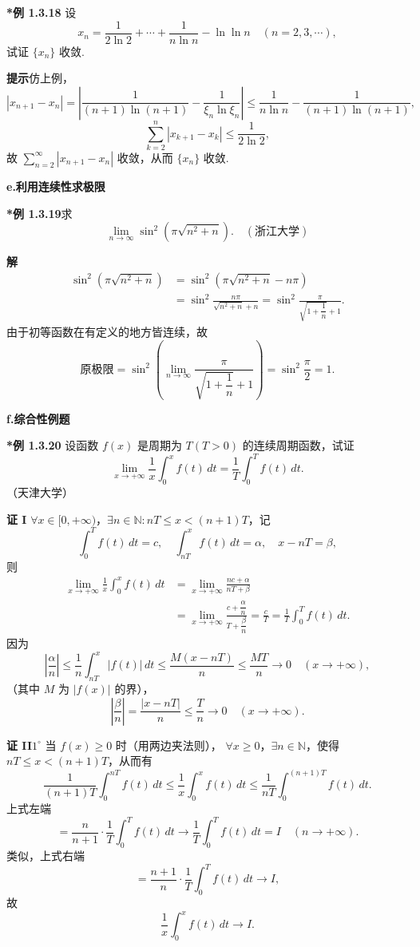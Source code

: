 \documentclass[UTF8, 12pt, fontset=fandol, oneside]{ctexart}
\begin{document}
\noindent\textbf{*例 1.3.18}\quad
设
\[
  x_n=\frac1{2\ln2}+\cdots+\frac1{n\ln n}-\ln\ln n
  \quad(n=2,3,\cdots),
\]
试证 $\{x_n\}$ 收敛.

\noindent\textbf{提示}\quad 仿上例，
\[
  |x_{n+1}-x_n|
  =\left|
  \frac1{(n+1)\ln(n+1)}-\frac1{\xi_n\ln\xi_n}
  \right|
  \le
  \frac1{n\ln n}-\frac1{(n+1)\ln(n+1)},
\]
\[
  \sum_{k=2}^n|x_{k+1}-x_k|
  \le\frac1{2\ln2},
\]
故 $\sum\limits_{n=2}^\infty|x_{n+1}-x_n|$ 收敛，从而
$\{x_n\}$ 收敛.

\noindent\textbf{e.\quad 利用连续性求极限}

\noindent\textbf{*例 1.3.19}\quad 求
\[
  \lim_{n\to\infty}\sin^2\left(\pi\sqrt{n^2+n}\right).
\quad(\text{浙江大学})
\]

\noindent\textbf{解}\quad
\[
\begin{aligned}
\sin^2\left(\pi\sqrt{n^2+n}\right)
&=\sin^2\left(\pi\sqrt{n^2+n}-n\pi\right)\\
&=\sin^2\frac{n\pi}{\sqrt{n^2+n}+n}
=\sin^2\frac{\pi}{\sqrt{1+\dfrac1n}+1}.
\end{aligned}
\]
由于初等函数在有定义的地方皆连续，故
\[
  \text{原极限}
  =\sin^2\left(
  \lim_{n\to\infty}
  \frac{\pi}{\sqrt{1+\dfrac1n}+1}
  \right)
  =\sin^2\frac\pi2=1.
\]

\noindent\textbf{f.\quad 综合性例题}

\noindent\textbf{*例 1.3.20}\quad
设函数 $f(x)$ 是周期为 $T(T>0)$ 的连续周期函数，试证
\[
  \lim_{x\to+\infty}\frac1x\int_0^xf(t)\,dt
  =\frac1T\int_0^Tf(t)\,dt.
\]
（天津大学）

\noindent\textbf{证 I}\quad
$\forall x\in[0,+\infty)$，$\exists n\in\mathbb N:nT\le x<(n+1)T$，记
\[
  \int_0^Tf(t)\,dt=c,\quad
  \int_{nT}^xf(t)\,dt=\alpha,\quad x-nT=\beta,
\]
则
\[
\begin{aligned}
\lim_{x\to+\infty}\frac1x\int_0^xf(t)\,dt
&=\lim_{x\to+\infty}\frac{nc+\alpha}{nT+\beta}\\
&=\lim_{x\to+\infty}
\frac{c+\dfrac{\alpha}{n}}{T+\dfrac{\beta}{n}}
=\frac cT=\frac1T\int_0^Tf(t)\,dt.
\end{aligned}
\]
因为
\[
  \left|\frac\alpha n\right|
  \le\frac1n\int_{nT}^x|f(t)|\,dt
  \le\frac{M(x-nT)}n
  \le\frac{MT}n\to0\quad(x\to+\infty),
\]
（其中 $M$ 为 $|f(x)|$ 的界），
\[
  \left|\frac\beta n\right|
  =\frac{|x-nT|}{n}\le\frac Tn\to0
  \quad(x\to+\infty).
\]

\noindent\textbf{证 II}\quad $1^\circ$ 当 $f(x)\ge0$ 时（用两边夹法则），
$\forall x\ge0$，$\exists n\in\mathbb N$，使得 $nT\le x<(n+1)T$，从而有
\[
  \frac1{(n+1)T}\int_0^{nT}f(t)\,dt
  \le
  \frac1x\int_0^xf(t)\,dt
  \le
  \frac1{nT}\int_0^{(n+1)T}f(t)\,dt.
\]
上式左端
\[
  =\frac n{n+1}\cdot\frac1T\int_0^Tf(t)\,dt
  \to\frac1T\int_0^Tf(t)\,dt=I
  \quad(n\to+\infty).
\]
类似，上式右端
\[
  =\frac{n+1}{n}\cdot\frac1T\int_0^Tf(t)\,dt
  \to I,
\]
故
\[
  \frac1x\int_0^xf(t)\,dt\to I.
\]
\end{document}
